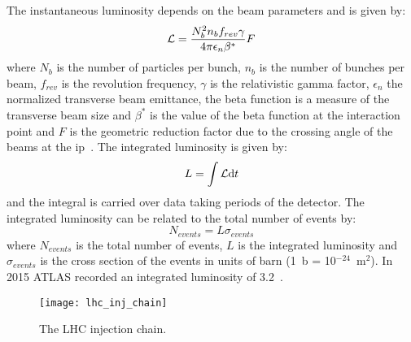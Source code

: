 The instantaneous luminosity depends on the beam parameters and is given by:
\begin{equation}
  \label{eq:54}
  \mathcal{L} = \frac{N^2_b n_b f_{rev} \gamma}{4 \pi \epsilon_n \beta^*} F
\end{equation}
where $N_b$ is the number of particles per bunch, $n_b$ is the number of bunches
per beam, $f_{rev}$ is the revolution frequency, $\gamma$ is the relativistic
gamma factor, $\epsilon_n$ the normalized transverse beam emittance, the beta
function is a measure of the transverse beam size and $\beta^*$ is the value of
the beta function at the interaction point and $F$ is the geometric reduction
factor due to the crossing angle of the beams at the \gls{ip}~\cite{LHC}. The
integrated luminosity is given by:
\begin{equation}
  \label{eq:55}
  L = \int \mathcal{L} \mathrm{d} t
\end{equation}
and the integral is carried over data taking periods of the detector. The
integrated luminosity can be related to the total number of events by:
\begin{equation}
  \label{eq:56}
  N_{events} = L \sigma_{events}
\end{equation}
where $N_{events}$ is the total number of events, $L$ is the integrated
luminosity and $\sigma_{events}$ is the cross section of the events in units of
barn (1~b = 10$^{-24}$~m$^2$). In 2015 ATLAS recorded an integrated luminosity
of 3.2~\ifb.

\begin{figure}[!h]
  \centering
    \texttt{[image: lhc\_inj\_chain]}
    \caption{The LHC injection chain.}
    \label{fig:lhc_inj_chain}
\end{figure}
